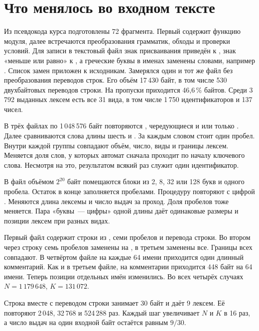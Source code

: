 \nextpage
\section{Что менялось во входном тексте}
Из псевдокода курса подготовлены 72 фрагмента. Первый содержит функцию модуля, далее встречаются преобразования грамматик, обходы и проверки условий. Для записи в текстовый файл знак присваивания приведён к \code{:=}, знак «меньше или равно» к \code{<=}, а греческие буквы в именах заменены словами, например . Список замен приложен к исходникам. Замерялся один и тот же файл без преобразования переводов строк. Его объём 17\,430 байт, в том числе 530 двухбайтовых переводов строки. На пропуски приходится 46,6\,\% байтов. Среди 3\,792 выданных лексем есть все 31 вида, в том числе 1\,750 идентификаторов и 137 чисел.

В трёх файлах по 1\,048\,576 байт повторяются , чередующиеся  и  или только . Далее сравниваются слова длины шесть  и . За каждым словом стоит один пробел. Внутри каждой группы совпадают объём, число, виды и границы лексем. Меняется доля слов, у которых автомат сначала проходит по началу ключевого слова. Несмотря на это, результатом всякий раз служит один идентификатор.

В файл объёмом $2^{20}$ байт помещаются блоки из 2, 8, 32 или 128 букв  и одного пробела. Остаток в конце заполняется пробелами. Процедуру повторяют с цифрой . Меняются длина лексемы и число выдач за проход. Доля пробелов тоже меняется. Пара «буквы~--- цифры» одной длины даёт одинаковые размеры и позиции лексем при разных видах.

Первый файл содержит строки из , семи пробелов и перевода строки. Во втором через строку семь пробелов заменены на , в третьем заменены все. Границы всех  совпадают. В четвёртом файле на каждые 64 имени приходится один длинный комментарий. Как и в третьем файле, на комментарии приходится 448 байт на 64 имени. Теперь позиции отдельных имён изменились. Во всех четырёх случаях $N=1\,179\,648$, $K=131\,072$.

Строка  вместе с переводом строки занимает 30 байт и даёт 9 лексем. Её повторяют 2\,048, 32\,768 и 524\,288 раз. Каждый шаг увеличивает $N$ и $K$ в 16 раз, а число выдач на один входной байт остаётся равным $9/30$.
